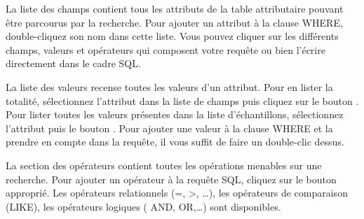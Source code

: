 La liste des champs contient tous les attributs de la table attributaire pouvant 
être parcourus par la recherche. Pour ajouter un attribut à la clause WHERE, 
double-cliquez son nom dans cette liste. Vous pouvez cliquer sur les différents 
champs, valeurs et opérateurs qui composent votre requête ou bien l'écrire 
directement dans le cadre SQL.

La liste des valeurs recense toutes les valeurs d'un attribut. Pour en lister la 
totalité, sélectionnez l'attribut dans la liste de champs puis cliquez sur le 
bouton . 
Pour lister toutes les valeurs présentes dans la liste d'échantillons, 
sélectionnez l'attribut puis le bouton . Pour ajouter une valeur à la clause 
WHERE et la prendre en compte dans la requête, il vous suffit de faire un 
double-clic dessus.

La section des opérateurs contient toutes les opérations menables sur une 
recherche. Pour ajouter un opérateur à la requête SQL, cliquez sur le bouton 
approprié. Les opérateurs relationnels (=, >, \dots), les opérateurs de 
comparaison (LIKE), les opérateurs logiques ( AND, OR,\dots) sont disponibles.

